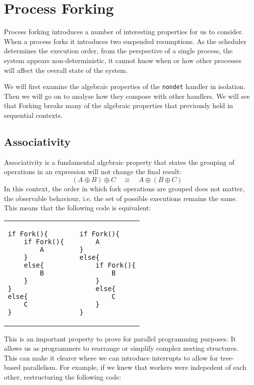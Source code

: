 \documentclass[logo,bsc,singlespacing,parskip]{infthesis}
\begin{document}
\section{Process Forking}
Process forking introduces a number of interesting properties for us to consider. When a process forks it introduces two suspended resumptions. As the scheduler determines the execution order, from the perspective of a single process, the system appears non-deterministic, it cannot know when or how other processes will affect the overall state of the system.

We will first examine the algebraic properties of the \texttt{nondet} handler in isolation. Then we will go on to analyse how they compose with other handlers. We will see that Forking breaks many of the algebraic properties that previously held in sequential contexts. 

\subsection*{Associativity}
Associativity is a fundamental algebraic property that states the grouping of operations in an expression will not change the final result: 
\[
(A \oplus B) \oplus C \quad \equiv \quad A \oplus (B \oplus C)
\]
In this context, the order in which fork operations are grouped does not matter, the observable behaviour, i.e. the set of possible executions remains the same. This means that the following code is equivalent:
\begin{table}[h]
\centering
\begin{tabular}{p{} c p{}}
\begin{lstlisting}
if Fork(){
    if Fork(){
        A
    }
    else{
        B
    }
}
else{
    C
}
\end{lstlisting}
&
&
\begin{lstlisting}
if Fork(){
    A
} 
else{
    if Fork(){
        B
    }
    else{
        C
    }
}
\end{lstlisting}
\end{tabular}
\end{table}
\vspace{-2em}

This is an important property to prove for parallel programming purposes. It allows us as programmers to rearrange or simplify complex nesting structures. This can make it clearer where we can introduce interrupts to allow for tree-based parallelism.
For example, if we knew that workers were indepedent of each other, restructuring the following code:
\end{document}
